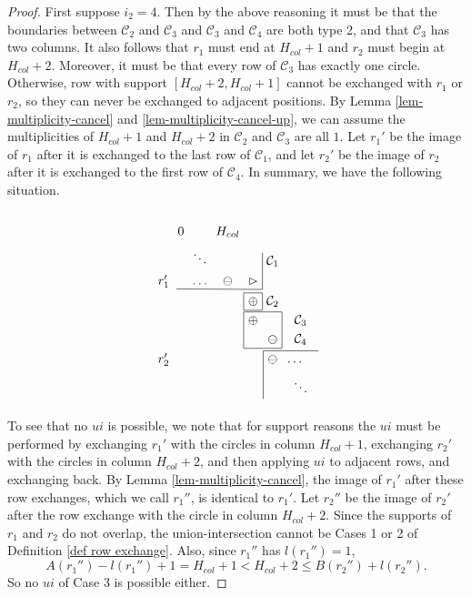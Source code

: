 \documentclass[11pt,letterpaper]{amsart}
\newcommand{\CC}{\mathcal{C}}
\numberwithin{equation}{section}
\begin{document}
\begin{proof}
    First suppose $i_2 = 4$. Then by the above reasoning it must be that the boundaries between $\CC_2$ and $\CC_3$ and $\CC_3$ and $\CC_4$ are both type 2, and that $\CC_3$ has two columns. It also follows that $r_1$ must end at $H_{col}+1$ and $r_2$ must begin at $H_{col}+2$. Moreover, it must be that every row of $\CC_3$ has exactly one circle. Otherwise, row with support $[H_{col}+2, H_{col}+1]$ cannot be exchanged with $r_1$ or $r_2$, so they can never be exchanged to adjacent positions. By Lemma \ref{lem-multiplicity-cancel} and \ref{lem-multiplicity-cancel-up}, we can assume the multiplicities of $H_{col}+1$ and $H_{col}+2$ in $\CC_2$ and $\CC_3$ are all $1$. Let $r_1'$ be the image of $r_1$ after it is exchanged to the last row of $\CC_1$, and let $r_2'$ be the image of $r_2$ after it is exchanged to the first row of $\CC_4$. In summary, we have the following situation.
    \[\begin{tikzpicture}[baseline=(current bounding box.north)]
      \matrix (m) [matrix of math nodes, nodes in empty cells] {
        & 0 & & H_{col} & & & \\
        & & \ddots & & \phantom{\oplus} & \CC_1 & \\
        r_1' & & \dots & \ominus & \rhd & & \\
        & & & & \oplus & \CC_2 & \\
        & & & & \oplus & & \CC_3 \\
        & & & & & \ominus & \CC_4 \\
        r_2' & & & & & \ominus & \dots \phantom{\oplus} \\
        & & & & & \phantom{\oplus} & \ddots \\
      } ;
      \draw (m-3-2.south west) -- (m-3-5.south east);
      \draw (m-2-5.north east) -- (m-3-5.south east);
      \draw (m-4-5.north west) rectangle (m-4-5.south east);
      \draw (m-5-5.north west) rectangle (m-6-6.south east);
      \draw (m-7-6.north west) -- (m-7-7.north east);
      \draw (m-7-6.north west) -- (m-8-6.south west);
    \end{tikzpicture}\]

    To see that no $ui$ is possible, we note that for support reasons the $ui$ must be performed by exchanging $r_1'$ with the circles in column $H_{col}+1$, exchanging $r_2'$ with the circles in column $H_{col}+2$, and then applying $ui$ to adjacent rows, and exchanging back. By Lemma \ref{lem-multiplicity-cancel}, the image of $r_1'$ after these row exchanges, which we call $r_1''$, is identical to $r_1'$. Let $r_2''$ be the image of $r_2'$ after the row exchange with the circle in column $H_{col}+2$. Since the supports of $r_1$ and $r_2$ do not overlap, the union-intersection cannot be Cases 1 or 2 of Definition \ref{def row exchange}. Also, since $r_1''$ has $l(r_1'') = 1$, \[A(r_1'') - l(r_1'') + 1 = H_{col}+1 < H_{col}+2 \leq B(r_2'') + l(r_2'').\] So no $ui$ of Case 3 is possible either.


\end{proof}
\end{document}
